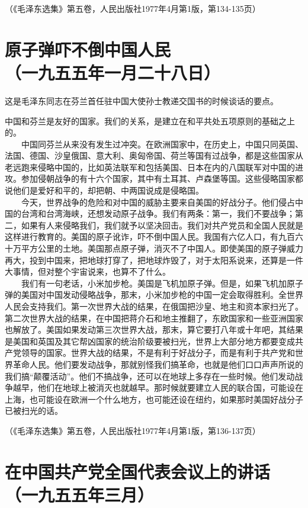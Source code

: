 \documentclass[cn,11pt,chinese]{elegantbook}
\def\myformat#1{\hfil\hfil #1}
\begin{document}
\begin{flushright}（《毛泽东选集》第五卷，人民出版社1977年4月第1版，第134-135页）\end{flushright}
\newpage\section*{\myformat{原子弹吓不倒中国人民}\\\myformat{（一九五五年一月二十八日）}}
\begin{introduction}\item  这是毛泽东同志在芬兰首任驻中国大使孙士教递交国书的时候谈话的要点。\end{introduction}
中国和芬兰是友好的国家。我们的关系，是建立在和平共处五项原则的基础之上的。\\
　　中国同芬兰从来没有发生过冲突。在欧洲国家中，在历史上，中国只同英国、法国、德国、沙皇俄国、意大利、奥匈帝国、荷兰等国有过战争，都是这些国家从老远跑来侵略中国的，比如英法联军和包括美国、日本在内的八国联军对中国的进攻。参加侵朝战争的有十六个国家，其中有土耳其、卢森堡等国。这些侵略国家都说他们是爱好和平的，却把朝、中两国说成是侵略国。\\
　　今天，世界战争的危险和对中国的威胁主要来自美国的好战分子。他们侵占中国的台湾和台湾海峡，还想发动原子战争。我们有两条：第一，我们不要战争；第二，如果有人来侵略我们，我们就予以坚决回击。我们对共产党员和全国人民就是这样进行教育的。美国的原子讹诈，吓不倒中国人民。我国有六亿人口，有九百六十万平方公里的土地。美国那点原子弹，消灭不了中国人。即使美国的原子弹威力再大，投到中国来，把地球打穿了，把地球炸毁了，对于太阳系说来，还算是一件大事情，但对整个宇宙说来，也算不了什么。\\
　　我们有一句老话，小米加步枪。美国是飞机加原子弹。但是，如果飞机加原子弹的美国对中国发动侵略战争，那末，小米加步枪的中国一定会取得胜利。全世界人民会支持我们。第一次世界大战的结果，在俄国把沙皇、地主和资本家扫光了。第二次世界大战的结果，在中国把蒋介石和地主推翻了，东欧国家和一些亚洲国家也解放了。美国如果发动第三次世界大战，那末，算它要打八年或十年吧，其结果是美国和英国及其它帮凶国家的统治阶级要被扫光，世界上大部分地方都要变成共产党领导的国家。世界大战的结果，不是有利于好战分子，而是有利于共产党和世界革命人民。他们要发动战争，那就别怪我们搞革命，也就是他们口口声声所说的我们搞“颠覆活动”。他们不搞战争，还可以在地球上多存在一些时候。他们发动战争越早，他们在地球上被消灭也就越早。那时候就要建立人民的联合国，可能设在上海，也可能设在欧洲一个什么地方，也可能还设在纽约，如果那时美国好战分子已被扫光的话。\\
\begin{flushright}（《毛泽东选集》第五卷，人民出版社1977年4月第1版，第136-137页）\end{flushright}
\newpage\section*{\myformat{在中国共产党全国代表会议上的讲话}\\\myformat{（一九五五年三月）}}
\end{document}

